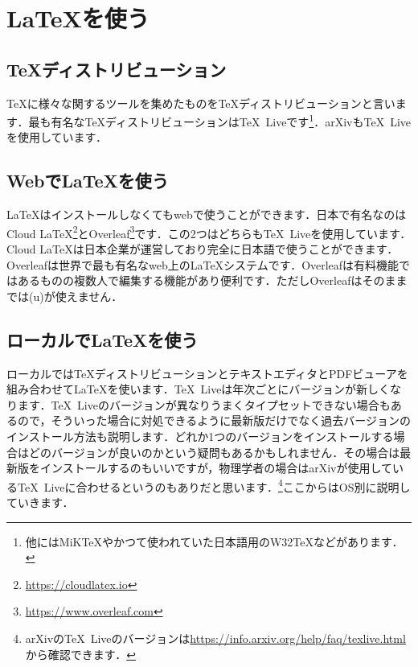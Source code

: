 \section{\LaTeX を使う}
\subsection{\TeX ディストリビューション}
\TeX に様々な関するツールを集めたものを\TeX ディストリビューションと言います．最も有名な\TeX ディストリビューションは\TeX\ Liveです\footnote{他にはMiK\TeX やかつて使われていた日本語用のW32\TeX などがあります．}．arXivも\TeX\ Liveを使用しています．

\subsection{Webで\LaTeX を使う}
\LaTeX はインストールしなくてもwebで使うことができます．日本で有名なのはCloud LaTeX\footnote{\url{https://cloudlatex.io}}とOverleaf\footnote{\url{https://www.overleaf.com}}です．この2つはどちらも\TeX\ Liveを使用しています．Cloud LaTeXは日本企業が運営しており完全に日本語で使うことができます．Overleafは世界で最も有名なweb上の\LaTeX システムです．Overleafは有料機能ではあるものの複数人で編集する機能があり便利です．ただしOverleafはそのままでは(u)\pLaTeX が使えません．

\subsection{ローカルで\LaTeX を使う}
ローカルでは\TeX ディストリビューションとテキストエディタとPDFビューアを組み合わせて\LaTeX を使います．\TeX\ Liveは年次ごとにバージョンが新しくなります．\TeX\ Liveのバージョンが異なりうまくタイプセットできない場合もあるので，そういった場合に対処できるように最新版だけでなく過去バージョンのインストール方法も説明します．どれか1つのバージョンをインストールする場合はどのバージョンが良いのかという疑問もあるかもしれません．その場合は最新版をインストールするのもいいですが，物理学者の場合はarXivが使用している\TeX\ Liveに合わせるというのもありだと思います．\footnote{arXivの\TeX\ Liveのバージョンは\url{https://info.arxiv.org/help/faq/texlive.html}から確認できます．}ここからはOS別に説明していきます．

